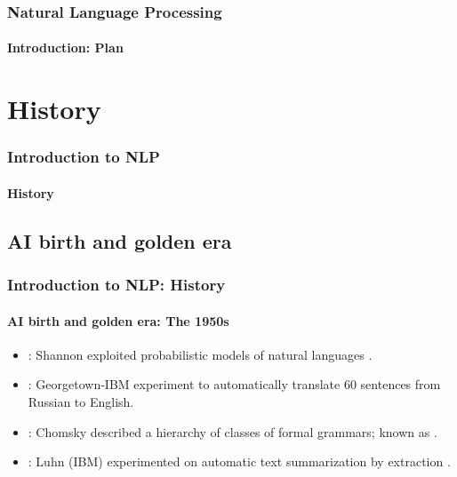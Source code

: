 \documentclass[xcolor=table]{beamer}
\begin{document}
\begin{frame}
\frametitle{Natural Language Processing}
\framesubtitle{Introduction: Plan}

\begin{multicols}{2}
\tableofcontents
\end{multicols}
\end{frame}

\section{History}

\begin{frame}
\frametitle{Introduction to NLP}
\framesubtitle{History}


\end{frame}

\subsection{AI birth and golden era}

\begin{frame}
\frametitle{Introduction to NLP: History}
\framesubtitle{AI birth and golden era: The 1950s}

\begin{itemize}
	\item {}: Shannon exploited probabilistic models of natural languages \cite{1951-shannon}.
	\item {}: Georgetown-IBM experiment to automatically translate 60 sentences from Russian to English.
	\item {}: Chomsky described a hierarchy of classes of formal grammars; known as .
	\item {}: Luhn (IBM) experimented on automatic text summarization by extraction \cite{1958-luhn}.
\end{itemize}

\end{frame}
\end{document}
